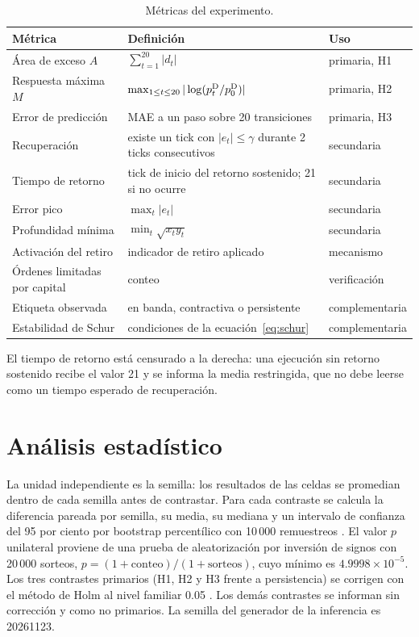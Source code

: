 \begin{table}[htbp]
\centering
\caption{Métricas del experimento.}
\label{tab:metricas}
\small
\begin{tabularx}{\textwidth}{@{}l >{\raggedright\arraybackslash}X l@{}}
\toprule
Métrica & Definición & Uso \\
\midrule
Área de exceso $A$ & $\sum_{t=1}^{20}|d_t|$ & primaria, H1 \\
Respuesta máxima $M$ & $\max_{1\le t\le 20}|\log(p^{\mathrm{D}}_t/p^{\mathrm{D}}_0)|$ & primaria, H2 \\
Error de predicción & MAE a un paso sobre 20 transiciones & primaria, H3 \\
Recuperación & existe un tick con $|e_t|\le\gamma$ durante 2 ticks consecutivos & secundaria \\
Tiempo de retorno & tick de inicio del retorno sostenido; 21 si no ocurre & secundaria \\
Error pico & $\max_t|e_t|$ & secundaria \\
Profundidad mínima & $\min_t\sqrt{x_ty_t}$ & secundaria \\
Activación del retiro & indicador de retiro aplicado & mecanismo \\
Órdenes limitadas por capital & conteo & verificación \\
Etiqueta observada & en banda, contractiva o persistente & complementaria \\
Estabilidad de Schur & condiciones de la ecuación~\eqref{eq:schur} & complementaria \\
\bottomrule
\end{tabularx}
\end{table}

El tiempo de retorno está censurado a la derecha: una ejecución sin retorno sostenido recibe el valor 21 y se informa la media restringida, que no debe leerse como un tiempo esperado de recuperación.

\section{Análisis estadístico}
\label{sec:analisis-estadistico}

La unidad independiente es la semilla: los resultados de las celdas se promedian dentro de cada semilla antes de contrastar. Para cada contraste se calcula la diferencia pareada por semilla, su media, su mediana y un intervalo de confianza del 95 por ciento por bootstrap percentílico con 10\,000 remuestreos \cite{efron1979bootstrap}. El valor $p$ unilateral proviene de una prueba de aleatorización por inversión de signos con 20\,000 sorteos, $p=(1+\text{conteo})/(1+\text{sorteos})$, cuyo mínimo es $4.9998\times10^{-5}$. Los tres contrastes primarios (H1, H2 y H3 frente a persistencia) se corrigen con el método de Holm al nivel familiar 0.05 \cite{holm1979simple}. Los demás contrastes se informan sin corrección y como no primarios. La semilla del generador de la inferencia es 20261123.

